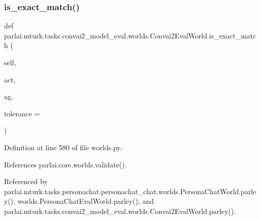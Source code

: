 \subsubsection{\texorpdfstring{is\+\_\+exact\+\_\+match()}{is\_exact\_match()}}
{\footnotesize\ttfamily def parlai.\+mturk.\+tasks.\+convai2\+\_\+model\+\_\+eval.\+worlds.\+Convai2\+Eval\+World.\+is\+\_\+exact\+\_\+match (\begin{DoxyParamCaption}\item[{}]{self,  }\item[{}]{act,  }\item[{}]{ag,  }\item[{}]{tolerance = {} }\end{DoxyParamCaption})}



Definition at line 580 of file worlds.\+py.



References parlai.\+core.\+worlds.\+validate().



Referenced by parlai.\+mturk.\+tasks.\+personachat.\+personachat\+\_\+chat.\+worlds.\+Persona\+Chat\+World.\+parley(), worlds.\+Persona\+Chat\+Eval\+World.\+parley(), and parlai.\+mturk.\+tasks.\+convai2\+\_\+model\+\_\+eval.\+worlds.\+Convai2\+Eval\+World.\+parley().

